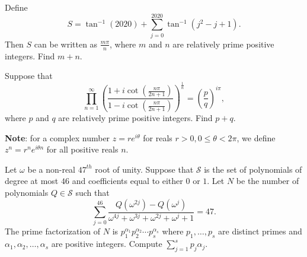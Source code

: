 %	



\begin{question}[name={2020-21 CHMMC Winter, Individual Round, \href{https://artofproblemsolving.com/community/c126h2426227p20001907}{Problem 8}}]
	Define
	\[
	S = \tan^{-1}(2020) + \sum_{j = 0}^{2020} \tan^{-1}(j^2 - j + 1).
	\]Then $S$ can be written as $\frac{m \pi}{n}$, where $m$ and $n$ are relatively prime positive integers. Find $m + n$.
\end{question}




%	


\begin{question}[name={2020-21 CHMMC Winter, Team Round, \href{https://artofproblemsolving.com/community/c126h2426256p20002117}{Problem 6}}]
	Suppose that
	\[
	\prod_{n=1}^{\infty}\left(\frac{1+i\cot\left(\frac{n\pi}{2n+1}\right)}{1-i\cot\left(\frac{n\pi}{2n+1}\right)}\right)^{\frac{1}{n}} = \left(\frac{p}{q}\right)^{i \pi},
	\]where $p$ and $q$ are relatively prime positive integers. Find $p+q$.
	
	\textbf{Note}: for a complex number $z = re^{i \theta}$ for reals $r > 0, 0 \le \theta < 2\pi$, we define $z^{n} = r^{n} e^{i \theta n}$ for all positive reals $n$.
\end{question}




%	



\begin{question}[name={2020-21 CHMMC Winter, Team Round, \href{https://artofproblemsolving.com/community/c126h2426264p20002195}{Problem 10}}]
	Let $\omega$ be a non-real $47^{th}$ root of unity. Suppose that $\mathcal{S}$ is the set of polynomials of degree at most $46$ and coefficients equal to either $0$ or $1$. Let $N$ be the number of polynomials $Q \in \mathcal{S}$ such that
	\[
	\sum_{j = 0}^{46} \frac{Q(\omega^{2j}) - Q(\omega^{j})}{\omega^{4j} + \omega^{3j} + \omega^{2j} + \omega^j + 1} =  47.
	\]The prime factorization of $N$ is $p_1^{\alpha_1}p_2^{\alpha_2} \cdots p_s^{\alpha_s}$ where $p_1, \ldots, p_s$ are distinct primes and $\alpha_1, \alpha_2, \ldots, \alpha_s$ are positive integers. Compute $\sum_{j = 1}^s p_j\alpha_j$.
\end{question}




